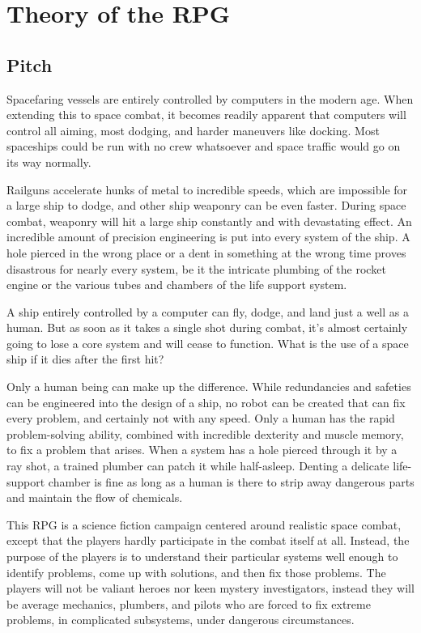\documentclass[a4paper]{article}
\begin{document}
\section{Theory of the RPG} \label{theory}

\subsection{Pitch}

Spacefaring vessels are entirely controlled by computers in the modern age. When extending this to space combat, it becomes readily apparent that computers will control all aiming, most dodging, and harder maneuvers like docking. Most spaceships could be run with no crew whatsoever and space traffic would go on its way normally.

Railguns accelerate hunks of metal to incredible speeds, which are impossible for a large ship to dodge, and other ship weaponry can be even faster. During space combat, weaponry will hit a large ship constantly and with devastating effect. An incredible amount of precision engineering is put into every system of the ship. A hole pierced in the wrong place or a dent in something at the wrong time proves disastrous for nearly every system, be it the intricate plumbing of the rocket engine or the various tubes and chambers of the life support system.

A ship entirely controlled by a computer can fly, dodge, and land just a well as a human. But as soon as it takes a single shot during combat, it's almost certainly going to lose a core system and will cease to function. What is the use of a space ship if it dies after the first hit?

Only a human being can make up the difference. While redundancies and safeties can be engineered into the design of a ship, no robot can be created that can fix every problem, and certainly not with any speed. Only a human has the rapid problem-solving ability, combined with incredible dexterity and muscle memory, to fix a problem that arises. When a system has a hole pierced through it by a ray shot, a trained plumber can patch it while half-asleep. Denting a delicate life-support chamber is fine as long as a human is there to strip away dangerous parts and maintain the flow of chemicals.

This RPG is a science fiction campaign centered around realistic space combat, except that the players hardly participate in the combat itself at all. Instead, the purpose of the players is to understand their particular systems well enough to identify problems, come up with solutions, and then fix those problems. The players will not be valiant heroes nor keen mystery investigators, instead they will be average mechanics, plumbers, and pilots who are forced to fix extreme problems, in complicated subsystems, under dangerous circumstances. 
\end{document}
